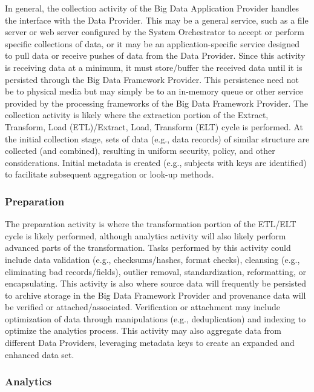 \documentclass[11pt]{article}
\begin{document}
In general, the collection activity of the Big Data Application Provider handles the interface with the Data 
Provider. This may be a general service, such as a file server or web server configured by the System 
Orchestrator to accept or perform specific collections of data, or it may be an application-specific service 
designed to pull data or receive pushes of data from the Data Provider. Since this activity is receiving data 
at a minimum, it must store/buffer the received data until it is persisted through the Big Data Framework 
Provider. This persistence need not be to physical media but may simply be to an in-memory queue or 
other service provided by the processing frameworks of the Big Data Framework Provider. The collection 
activity is likely where the extraction portion of the Extract, Transform, Load (ETL)/Extract, Load, 
Transform (ELT) cycle is performed. At the initial collection stage, sets of data (e.g., data records) of 
similar structure are collected (and combined), resulting in uniform security, policy, and other 
considerations. Initial metadata is created (e.g., subjects with keys are identified) to facilitate subsequent 
aggregation or look-up methods.

\subsubsection{Preparation}

The preparation activity is where the transformation portion of the ETL/ELT cycle is likely performed, 
although analytics activity will also likely perform advanced parts of the transformation. Tasks performed 
by this activity could include data validation (e.g., checksums/hashes, format checks), cleansing (e.g., 
eliminating bad records/fields), outlier removal, standardization, reformatting, or encapsulating. This 
activity is also where source data will frequently be persisted to archive storage in the Big Data 
Framework Provider and provenance data will be verified or attached/associated. Verification or 
attachment may include optimization of data through manipulations (e.g., deduplication) and indexing to 
optimize the analytics process. This activity may also aggregate data from different Data Providers, 
leveraging metadata keys to create an expanded and enhanced data set.

\subsubsection{Analytics}
\end{document}
